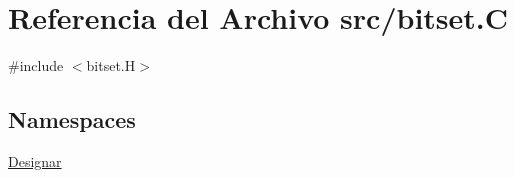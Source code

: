 \hypertarget{bitset_8_c}{}\section{Referencia del Archivo src/bitset.C}
\label{bitset_8_c}
{\ttfamily \#include $<$bitset.\+H$>$}\newline
\subsection*{Namespaces}
\begin{DoxyCompactItemize}
\item 
 \hyperlink{namespace_designar}{Designar}
\end{DoxyCompactItemize}
